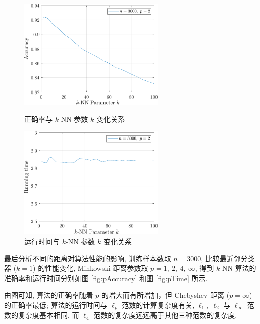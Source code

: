\documentclass[openany]{ctexbook}
\theoremstyle{kaiti}
\theoremstyle{normal}
\begin{document}
\begin{figure}[htbp]
  \centering
  \begin{minipage}[t]{0.48\textwidth}
    \centering
    \includegraphics[width=7cm]{kAccuracy.pdf}
    \caption{正确率与 $k$-NN 参数 $k$ 变化关系}
    \label{fig:kAccuracy}
  \end{minipage}
  \begin{minipage}[t]{0.48\textwidth}
    \centering
    \includegraphics[width=7cm]{kTime.pdf}
    \caption{运行时间与 $k$-NN 参数 $k$ 变化关系}
    \label{fig:kTime}
  \end{minipage}
\end{figure}

最后分析不同的距离对算法性能的影响, 训练样本数取 $n=3000$, 比较最近邻分类器 ($k=1$) 的性能变化, Minkowski 距离参数取 $p=1,~2,~4,~\infty$, 得到 $k$-NN 算法的准确率和运行时间分别如图 \ref{fig:pAccuracy} 和图 \ref{fig:pTime} 所示.

由图可知, 算法的正确率随着 $p$ 的增大而有所增加，但 Chebyshev 距离 ($p=\infty$) 的正确率最低; 算法的运行时间与 $\ell_p$ 范数的计算复杂度有关, $\ell_1,~\ell_2$ 与 $\ell_\infty$ 范数的复杂度基本相同, 而 $\ell_4$ 范数的复杂度远远高于其他三种范数的复杂度.
\end{document}
